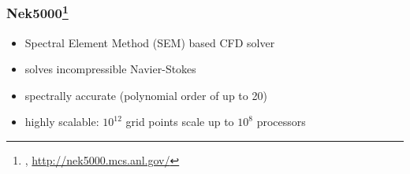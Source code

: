 \begin{frame}
    \frametitle{Nek5000\footnote{\cite{nekmanual}, \url{http://nek5000.mcs.anl.gov/}}}
    \begin{itemize}
      \item Spectral Element Method (SEM) based CFD solver
      \item solves incompressible Navier-Stokes
      \item spectrally accurate (polynomial order of up to 20)
      \item highly scalable: $10^{12}$ grid points scale up to $10^8$ processors
    \end{itemize}
\begin{figure}
  \centering
\end{figure}
\end{frame}



